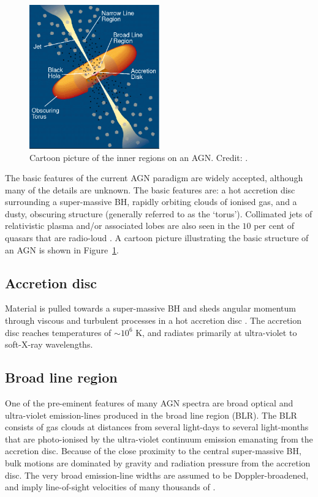 \begin{figure}
  \centering
  \includegraphics[width=0.5\textwidth]{figures/chapter05/urry_model}
  \caption[{Illustration of the physical structure of an AGN in a simple orientation-based unification model.}]{Cartoon picture of the inner regions on an AGN. Credit: \citet{urry95}.}
  \label{fig:agnmodel}
\end{figure}

The basic features of the current AGN paradigm are widely accepted, although many of the details are unknown. 
The basic features are: a hot accretion disc surrounding a super-massive BH, rapidly orbiting clouds of ionised gas, and a dusty, obscuring structure (generally referred to as the `torus'). 
Collimated jets of relativistic plasma and/or associated lobes are also seen in the $10$ per cent of quasars that are radio-loud \citep[e.g.][]{peterson97}. 
A cartoon picture illustrating the basic structure of an AGN is shown in Figure~\ref{fig:agnmodel}. 

\subsection{Accretion disc}

Material is pulled towards a super-massive BH and sheds angular momentum through viscous and turbulent processes in a hot accretion disc \citep[e.g.][]{begelman85}. 
The accretion disc reaches temperatures of $\sim10^6$ K, and radiates primarily at ultra-violet to soft-X-ray wavelengths. 

\subsection{Broad line region}

One of the pre-eminent features of many AGN spectra are broad optical and ultra-violet emission-lines produced in the broad line region (BLR). 
The BLR consists of gas clouds at distances from several light-days to several light-months that are photo-ionised by the ultra-violet continuum emission emanating from the accretion disc.  
Because of the close proximity to the central super-massive BH, bulk motions are dominated by gravity and radiation pressure from the accretion disc.
The very broad emission-line widths are assumed to be Doppler-broadened, and imply line-of-sight velocities of many thousands of \kms. 

